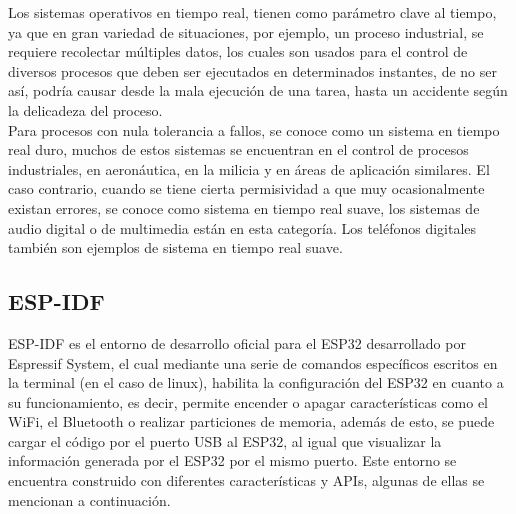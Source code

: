 Los sistemas operativos en tiempo real, tienen como parámetro clave al tiempo, ya que en gran variedad de situaciones, por ejemplo, un proceso industrial, se requiere recolectar múltiples datos, los cuales son usados para el control de diversos procesos que deben ser ejecutados en determinados instantes, de no ser así, podría causar desde la mala ejecución de una tarea, hasta un accidente según la delicadeza del proceso.\\ 

Para procesos con nula tolerancia a fallos, se conoce como un sistema en tiempo real duro, muchos de estos sistemas se encuentran en el control de procesos industriales, en aeronáutica, en la milicia y en áreas de aplicación similares. El caso contrario, cuando se tiene cierta permisividad a que muy ocasionalmente existan errores, se conoce como sistema en tiempo real suave, los sistemas de audio digital o de multimedia están en esta categoría. Los teléfonos digitales también son ejemplos de sistema en tiempo real suave. \cite{SO} \\

%

\subsection{ESP-IDF}

ESP-IDF es el entorno de desarrollo oficial para el ESP32 desarrollado por Espressif System, el cual mediante una serie de comandos específicos escritos en la terminal (en el caso de linux), habilita la configuración del ESP32 en cuanto a su funcionamiento, es decir, permite encender o apagar características como el WiFi, el Bluetooth o realizar particiones de memoria, además de esto, se puede cargar el código por el puerto USB al ESP32, al igual que visualizar la información generada por el ESP32 por el mismo puerto. Este entorno se encuentra construido con diferentes características y APIs, algunas de ellas se mencionan a continuación. \cite{ES}

